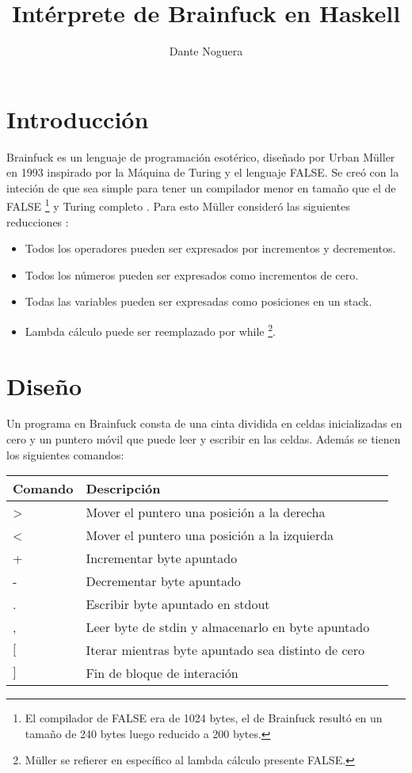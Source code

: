 \documentclass[a4paper, 12pt]{article}
\title{Int\'erprete de Brainfuck en Haskell}
\author{Dante Noguera}
\date{}
\begin{document}
\section*{Introducción}

Brainfuck es un lenguaje de programación esotérico, diseñado por Urban Müller en 1993 inspirado por la Máquina de Turing y el lenguaje FALSE.
Se creó con la inteción de que sea simple para tener un compilador menor en tamaño que el de FALSE \footnote{El compilador de FALSE era de 1024 bytes, el de Brainfuck resultó en un tamaño de 240 bytes luego reducido a 200 bytes.} y Turing completo \cite{w}. 
Para esto Müller consideró las siguientes reducciones \cite{y}:
\begin{itemize}
	\item Todos los operadores pueden ser expresados por incrementos y decrementos.
	\item Todos los números pueden ser expresados como incrementos de cero.
	\item Todas las variables pueden ser expresadas como posiciones en un stack.
	\item Lambda cálculo puede ser reemplazado por while \footnote{Müller se refierer en específico al lambda cálculo presente FALSE.}.
\end{itemize}


\section*{Diseño}

Un programa en Brainfuck consta de una cinta dividida en celdas inicializadas en cero y un puntero móvil que puede leer y escribir en las celdas. Además se tienen los siguientes comandos:

\begin{center}
\begin{tabular}{ |l|l|l| } 
 \hline
 Comando & Descripción \\
 \hline
 \textgreater & Mover el puntero una posición a la derecha \\ 
 \textless & Mover el puntero una posición a la izquierda \\ 
 + & Incrementar byte apuntado \\ 
 - & Decrementar byte apuntado \\ 
 . & Escribir byte apuntado en stdout \\ 
 , & Leer byte de stdin y almacenarlo en byte apuntado \\ 
 $[$ & Iterar mientras byte apuntado sea distinto de cero \\ 
 $]$ & Fin de bloque de interación \\ 
 \hline
\end{tabular}
\end{center}


\nocite{*}
\printbibliography
\end{document}
